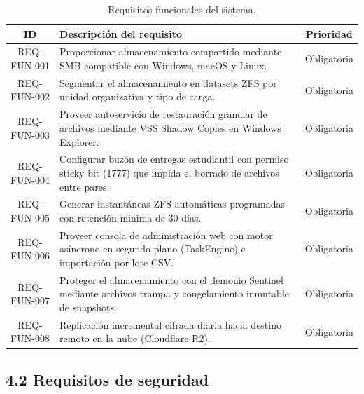 \documentclass[10pt,a4paper]{article}
\begin{document}
\begin{table}[htbp]
\centering
\small
\caption{Requisitos funcionales del sistema.}
\label{tab:req_fun}
\begin{tabular}{|c|p{11.5cm}|c|}
\hline
\textbf{\textsf{ID}} & \textbf{\textsf{Descripción del requisito}} & \textbf{\textsf{Prioridad}} \\
\hline
REQ-FUN-001 & Proporcionar almacenamiento compartido mediante SMB compatible con Windows, macOS y Linux. & Obligatoria \\
\hline
REQ-FUN-002 & Segmentar el almacenamiento en datasets ZFS por unidad organizativa y tipo de carga. & Obligatoria \\
\hline
REQ-FUN-003 & Proveer autoservicio de restauración granular de archivos mediante VSS Shadow Copies en Windows Explorer. & Obligatoria \\
\hline
REQ-FUN-004 & Configurar buzón de entregas estudiantil con permiso sticky bit (1777) que impida el borrado de archivos entre pares. & Obligatoria \\
\hline
REQ-FUN-005 & Generar instantáneas ZFS automáticas programadas con retención mínima de 30 días. & Obligatoria \\
\hline
REQ-FUN-006 & Proveer consola de administración web con motor asíncrono en segundo plano (TaskEngine) e importación por lote CSV. & Obligatoria \\
\hline
REQ-FUN-007 & Proteger el almacenamiento con el demonio Sentinel mediante archivos trampa y congelamiento inmutable de snapshots. & Obligatoria \\
\hline
REQ-FUN-008 & Replicación incremental cifrada diaria hacia destino remoto en la nube (Cloudflare R2). & Obligatoria \\
\hline
\end{tabular}
\end{table}

\subsection{4.2 Requisitos de seguridad}
\end{document}
